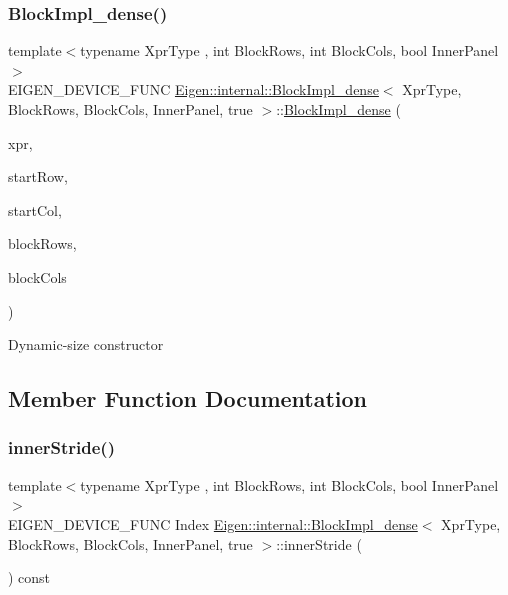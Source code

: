 \subsubsection{\texorpdfstring{BlockImpl\_dense()}{BlockImpl\_dense()}\hspace{0.1cm}{\footnotesize\ttfamily [3/3]}}
{\footnotesize\ttfamily template$<$typename Xpr\+Type , int Block\+Rows, int Block\+Cols, bool Inner\+Panel$>$ \\
E\+I\+G\+E\+N\+\_\+\+D\+E\+V\+I\+C\+E\+\_\+\+F\+U\+NC \mbox{\hyperlink{class_eigen_1_1internal_1_1_block_impl__dense}{Eigen\+::internal\+::\+Block\+Impl\+\_\+dense}}$<$ Xpr\+Type, Block\+Rows, Block\+Cols, Inner\+Panel, true $>$\+::\mbox{\hyperlink{class_eigen_1_1internal_1_1_block_impl__dense}{Block\+Impl\+\_\+dense}} (\begin{DoxyParamCaption}\item[{Xpr\+Type \&}]{xpr,  }\item[{Index}]{start\+Row,  }\item[{Index}]{start\+Col,  }\item[{Index}]{block\+Rows,  }\item[{Index}]{block\+Cols }\end{DoxyParamCaption})\hspace{0.3cm}{\ttfamily [inline]}}

Dynamic-\/size constructor 

\subsection{Member Function Documentation}
\mbox{\label{class_eigen_1_1internal_1_1_block_impl__dense_3_01_xpr_type_00_01_block_rows_00_01_block_cols_00_01_inner_panel_00_01true_01_4_a91fea2e027a3b057b5f70ab52a1a24b7}} 
\subsubsection{\texorpdfstring{innerStride()}{innerStride()}}
{\footnotesize\ttfamily template$<$typename Xpr\+Type , int Block\+Rows, int Block\+Cols, bool Inner\+Panel$>$ \\
E\+I\+G\+E\+N\+\_\+\+D\+E\+V\+I\+C\+E\+\_\+\+F\+U\+NC Index \mbox{\hyperlink{class_eigen_1_1internal_1_1_block_impl__dense}{Eigen\+::internal\+::\+Block\+Impl\+\_\+dense}}$<$ Xpr\+Type, Block\+Rows, Block\+Cols, Inner\+Panel, true $>$\+::inner\+Stride (\begin{DoxyParamCaption}{ }\end{DoxyParamCaption}) const\hspace{0.3cm}{\ttfamily [inline]}}

